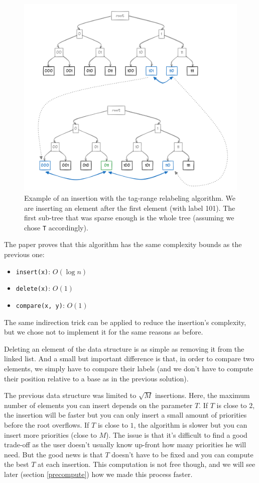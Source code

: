 \documentclass[12pt]{article}
\begin{document}
\begin{figure}[h!]
    \includegraphics[width=450px, keepaspectratio]{./bender-ex.png}
    \caption{Example of an insertion with the tag-range relabeling algorithm. We are inserting an element after the first element (with label 101). The first sub-tree that was sparse enough is the whole tree (assuming we chose \texttt{T} accordingly).}
    \label{bender}
\end{figure}

The paper proves that this algorithm has the same complexity bounds as the previous one:
\begin{itemize}
    \item \texttt{insert(x)}: $O(\log n)$
    \item \texttt{delete(x)}: $O(1)$
    \item \texttt{compare(x, y)}: $O(1)$
\end{itemize}

The same indirection trick can be applied to reduce the insertion's complexity, but we chose not to implement it for the same reasons as before.

Deleting an element of the data structure is as simple as removing it from the linked list.
And a small but important difference is that, in order to compare two elements, we simply have to compare their labels (and we don't have to compute their position relative to a base as in the previous solution).

The previous data structure was limited to $\sqrt{M}$ insertions. Here, the maximum number of elements you can insert depends on the parameter $T$. If $T$ is close to $2$, the insertion will be faster but you can only insert a small amount of priorities before the root overflows. If $T$ is close to $1$, the algorithm is slower but you can insert more priorities (close to $M$).
The issue is that it's difficult to find a good trade-off as the user doesn't usually know up-front how many priorities he will need.
But the good news is that $T$ doesn't have to be fixed and you can compute the best $T$ at each insertion.
This computation is not free though, and we will see later (section \ref{precompute}) how we made this process faster.
\end{document}
